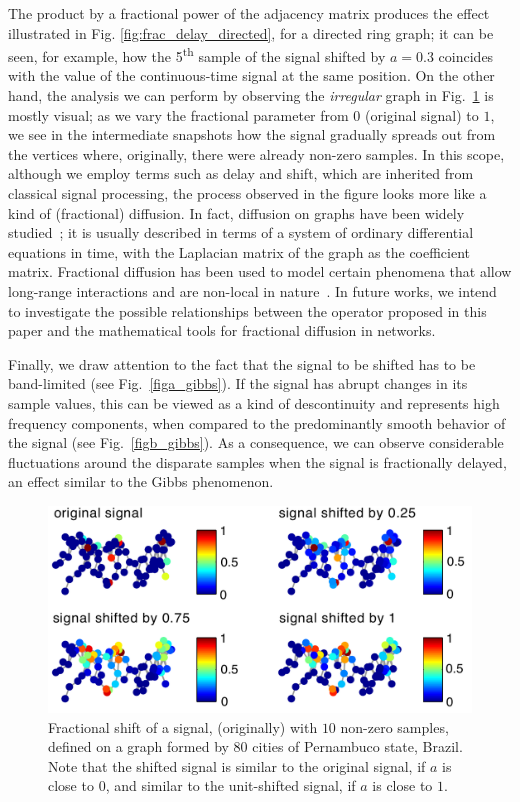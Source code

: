 The product by a fractional power of the adjacency matrix produces the effect illustrated in Fig. \ref{fig:frac_delay_directed}, for a directed ring graph; it can be seen, for example, how the 5\textsuperscript{th} sample of the signal shifted by $a=0{.}3 $ coincides with the value of the continuous-time signal at the same position. On the other hand, the analysis we can perform by observing the \textit{irregular} graph in Fig.~\ref{fig:sinal_Pernambuco} is mostly visual; as we vary the fractional parameter from $0$ (original signal) to $1$, we see in the intermediate snapshots how the signal gradually spreads out from the vertices where, originally, there were already non-zero samples. In this scope, although we employ terms such as delay and shift, which are inherited from classical signal processing, the process observed in the figure looks more like a kind of (fractional) diffusion. In fact, diffusion on graphs have been widely studied~\cite{zhang2008,thanou2017, benzi2021}; it is usually described in terms of a system of ordinary differential equations in time, with the Laplacian matrix of the graph as the coefficient matrix. Fractional diffusion has been used to model certain phenomena that allow long-range interactions and are non-local in nature~\cite{ilic2005,riascos2014,estrada2021,antil2021}. In future works, we intend to investigate the possible relationships between the operator proposed in this paper and the mathematical tools for fractional diffusion in networks. 

Finally, we draw attention to the fact that the signal to be shifted has to be band-limited (see Fig.~\ref{figa_gibbs}). If the signal has abrupt changes in its sample values, this can be viewed as a kind of descontinuity and represents high frequency components, when compared to the predominantly smooth behavior of the signal (see Fig.~\ref{figb_gibbs}). As a consequence, we can observe considerable fluctuations around the disparate samples when the signal is fractionally delayed, an effect similar to the Gibbs phenomenon.

\begin{figure}[t!]
	\centering
\includegraphics[width=0.95\linewidth]{Figures/signal_PE_V2_PT.pdf}
	\caption{Fractional shift of a signal, (originally) with $10$ non-zero samples, defined on a graph formed by $80$ cities of Pernambuco state, Brazil. Note that the shifted signal is similar to the original signal, if $ a $ is close to $0$, and similar to the unit-shifted signal, if $ a $ is close to $1$.}%
	\label{fig:sinal_Pernambuco}%
	\vspace{-0.2cm}
\end{figure}


